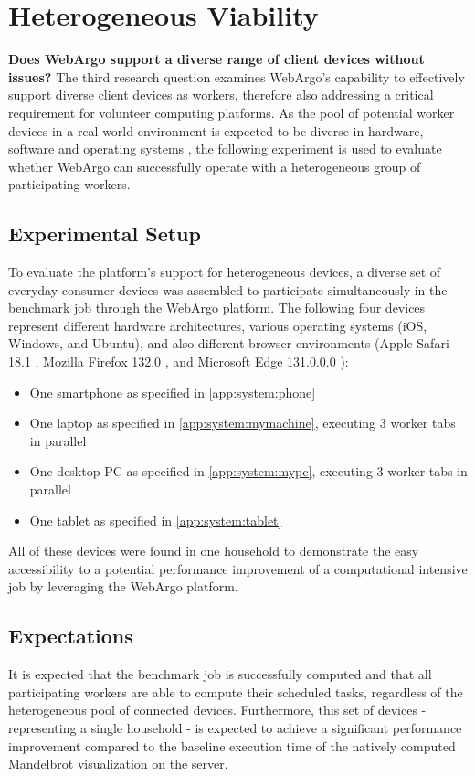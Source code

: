 \section{Heterogeneous Viability}
\label{sec:evaluation:heterogen}
\textbf{Does WebArgo support a diverse range of client devices without issues?}
The third research question examines WebArgo's capability to effectively support diverse client devices as workers, therefore also addressing a critical requirement for volunteer computing platforms. As the pool of potential worker devices in a real-world environment is expected to be diverse in hardware, software and operating systems \cite{intro:diverseDevices}, the following experiment is used to evaluate whether WebArgo can successfully operate with a heterogeneous group of participating workers.

\subsection{Experimental Setup}
To evaluate the platform's support for heterogeneous devices, a diverse set of everyday consumer devices was assembled to participate simultaneously in the benchmark job through the WebArgo platform. The following four devices represent different hardware architectures, various operating systems (iOS, Windows, and Ubuntu), and also different browser environments (Apple Safari 18.1 \cite{evaluation:safari}, Mozilla Firefox 132.0 \cite{background:firefox}, and Microsoft Edge 131.0.0.0 \cite{evaluation:edge}):
\begin{itemize}
    \item One smartphone as specified in \autoref{app:system:phone}
    \item One laptop as specified in \autoref{app:system:mymachine}, executing 3 worker tabs in parallel
    \item One desktop \ac{PC} as specified in \autoref{app:system:mypc}, executing 3 worker tabs in parallel
    \item One tablet as specified in \autoref{app:system:tablet}
\end{itemize}
All of these devices were found in one household to demonstrate the easy accessibility to a potential performance improvement of a computational intensive job by leveraging the WebArgo platform.

\subsection{Expectations}
It is expected that the benchmark job is successfully computed and that all participating workers are able to compute their scheduled tasks, regardless of the heterogeneous pool of connected devices. Furthermore, this set of devices - representing a single household - is expected to achieve a significant performance improvement compared to the baseline execution time of the natively computed Mandelbrot visualization on the server.  

